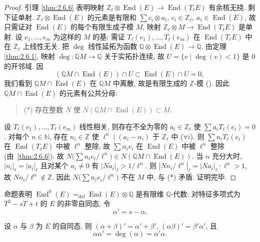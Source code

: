 \begin{proof}
引理 \ref{thm:2.6.6} 表明映射 $\mathbb{Z}_\ell\otimes\operatorname{End}(E)\to\operatorname{End}(T_\ell E)$ 有余核无挠. 剩下证单射. $\mathbb{Z}_\ell\otimes\operatorname{End}(E)$ 的元素是有限和 $\sum c_i\otimes a_i$, $c_i\in\mathbb{Z}_\ell$, $a_i\in\operatorname{End}(E)$, 故只需证对 $\operatorname{End}(E)$ 的每个有限生成子模 $M$, 映射 $\mathbb{Z}_\ell\otimes M\to\operatorname{End}(T_\ell E)$ 是单射. 设 $e_1,\dots,e_m$ 为这样的 $M$ 的基; 需证 $T_\ell(e_1),\dots,T_\ell(e_m)$ 在 $\operatorname{End}(T_\ell E)$ 中在 $\mathbb{Z}_\ell$ 上线性无关. 把 $\deg$ 线性延拓为函数 $\mathbb{Q}\otimes\operatorname{End}(E)\to\mathbb{Q}$. 由定理 \ref{thm:2.6.1}, 映射 $\deg\colon\mathbb{Q}M\to\mathbb{Q}$ 关于实拓扑连续, 故 $U = \{v \mid \deg(v) < 1\}$ 是 $0$ 的开邻域. 因
\[
(\mathbb{Q}M\cap\operatorname{End}(E))\cap U\subset\operatorname{End}(E)\cap U = 0,
\]
我们看到 $\mathbb{Q}M\cap\operatorname{End}(E)$ 在 $\mathbb{Q}M$ 中离散, 故是有限生成的 $\mathbb{Z}$-模 (\cite[4.15]{milne-ant}). 因此 $\mathbb{Q}M\cap\operatorname{End}(E)$ 的元素有公共分母:
\begin{quote}\small
($*$) 存在整数 $N$ 使 $N(\mathbb{Q}M\cap\operatorname{End}(E))\subset M$.
\end{quote}
设 $T_\ell(e_1),\dots,T_\ell(e_m)$ 线性相关, 则存在不全为零的 $a_i\in\mathbb{Z}_\ell$ 使 $\sum a_iT_\ell(e_i) = 0$. 对每个 $n\in\mathbb{N}$, 存在 $n_i\in\mathbb{Z}$ 使 $\ell^n\mid(a_i - n_i)$ 于 $\mathbb{Z}_\ell$ 中 ($\forall i$). 则 $\sum n_iT_\ell(e_i)$ 在 $\operatorname{End}(T_\ell E)$ 中被 $\ell^n$ 整除, 故 $\sum n_ie_i$ 在 $\operatorname{End}(E)$ 中被 $\ell^n$ 整除 (由~\ref{thm:2.6.6}). 故 $N\bigl(\sum n_ie_i/\ell^n\bigr)\in N(\mathbb{Q}M\cap\operatorname{End}(E))$. 当 $n$ 充分大时, $|n_i|_\ell = |a_i|_\ell$ 且对某个 $a_i\neq 0$ 有 $|Na_i|_\ell > 1/\ell^n$. 则 $|Nn_i/\ell^n|_\ell = |Na_i|_\ell\cdot\ell^n > 1$, 故 $Nn_i/\ell^n\notin\mathbb{Z}$. 因此 $N\bigl(\sum n_ie_i/\ell^n\bigr)$ 不在 $M$ 中, 与 ($*$) 矛盾. 证明完毕.
\end{proof}

命题表明 $\operatorname{End}^0(E) \mathrel{=_{\mathrm{def}}} \operatorname{End}(E)\otimes\mathbb{Q}$ 是有限维 $\mathbb{Q}$-代数: 对特征多项式为 $T^2 - sT + t$ 的 $E$ 的非零自同态, 令
\[
\alpha' = s - \alpha.
\]

\begin{proposition} \label{thm:2.6.8} 
设 $\alpha$ 与 $\beta$ 为 $E$ 的自同态. 则 $(\alpha+\beta)' = \alpha' + \beta'$, $(\alpha\beta)' = \beta'\alpha'$, 且
\[
\alpha\alpha' = \deg(\alpha) = \alpha'\alpha.
\]
\end{proposition}

